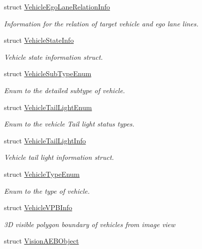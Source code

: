 \begin{DoxyCompactItemize}
struct \hyperlink{structmaf__perception__interface_1_1VehicleEgoLaneRelationInfo}{Vehicle\+Ego\+Lane\+Relation\+Info}
\begin{DoxyCompactList}\small\item\em Information for the relation of target vehicle and ego lane lines. \end{DoxyCompactList}\item 
struct \hyperlink{structmaf__perception__interface_1_1VehicleStateInfo}{Vehicle\+State\+Info}
\begin{DoxyCompactList}\small\item\em Vehicle state information struct. \end{DoxyCompactList}\item 
struct \hyperlink{structmaf__perception__interface_1_1VehicleSubTypeEnum}{Vehicle\+Sub\+Type\+Enum}
\begin{DoxyCompactList}\small\item\em Enum to the detailed subtype of vehicle. \end{DoxyCompactList}\item 
struct \hyperlink{structmaf__perception__interface_1_1VehicleTailLightEnum}{Vehicle\+Tail\+Light\+Enum}
\begin{DoxyCompactList}\small\item\em Enum to the vehicle Tail light status types. \end{DoxyCompactList}\item 
struct \hyperlink{structmaf__perception__interface_1_1VehicleTailLightInfo}{Vehicle\+Tail\+Light\+Info}
\begin{DoxyCompactList}\small\item\em Vehicle tail light information struct. \end{DoxyCompactList}\item 
struct \hyperlink{structmaf__perception__interface_1_1VehicleTypeEnum}{Vehicle\+Type\+Enum}
\begin{DoxyCompactList}\small\item\em Enum to the type of vehicle. \end{DoxyCompactList}\item 
struct \hyperlink{structmaf__perception__interface_1_1VehicleVPBInfo}{Vehicle\+V\+P\+B\+Info}
\begin{DoxyCompactList}\small\item\em 3D visible polygon boundary of vehicles from image view \end{DoxyCompactList}\item 
struct \hyperlink{structmaf__perception__interface_1_1VisionAEBObject}{Vision\+A\+E\+B\+Object}

\end{DoxyCompactItemize}
